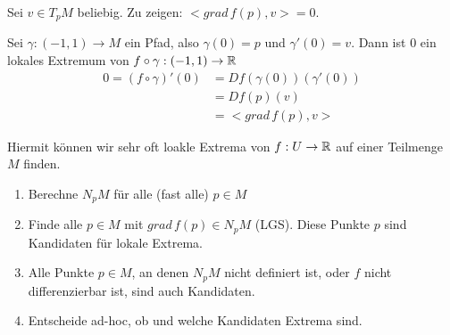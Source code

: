 \documentclass[main.tex]{subfiles}
\begin{document}
\begin{Beweis}
  Sei $v \in T_p M$ beliebig. Zu zeigen: $< grad \, f(p), v> = 0$.

  Sei $\gamma: (-1,1) \to M$ ein Pfad, also $\gamma(0) = p$ und $\gamma'(0) = v$. Dann ist $0$ ein lokales Extremum von $f \circ \gamma: (-1,1) \to \mathbb{R}$
  $$\begin{aligned}
    0 = (f \circ \gamma)' (0) & = Df(\gamma(0))(\gamma'(0)) \\
    & = Df(p)(v) \\
    & = < grad \, f(p),v>
  \end{aligned}$$
\end{Beweis}

\begin{Bemerkung}[Strategie]
  Hiermit können wir sehr oft loakle Extrema von $f: U \to \mathbb{R}$ auf einer Teilmenge $M$ finden.
  \begin{enumerate}
    \item Berechne $N_p M$ für alle (fast alle) $p \in M$
    \item Finde alle $p \in M$ mit $grad \, f(p) \in N_p M$ (LGS). Diese Punkte $p$ sind Kandidaten für lokale Extrema.
    \item Alle Punkte $p \in M$, an denen $N_p M$ nicht definiert ist, oder $f$ nicht differenzierbar ist, sind auch Kandidaten.
    \item Entscheide ad-hoc, ob und welche Kandidaten Extrema sind.
  \end{enumerate}
\end{Bemerkung}
\end{document}
